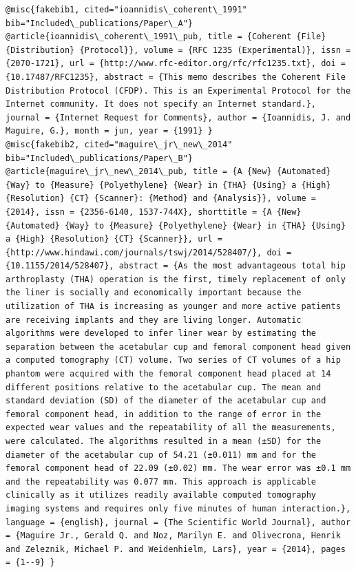 \documentclass[12pt, twoside]{article}
\begin{document}
\begin{lstlisting}[style=latexExampleForAuthors, caption={Examples of fake bibliographic entries}, label=lst:fakebibentry]
@misc{fakebib1, cited="ioannidis\_coherent\_1991" bib="Included\_publications/Paper\_A"}
@article{ioannidis\_coherent\_1991\_pub, title = {Coherent {File} {Distribution} {Protocol}}, volume = {RFC 1235 (Experimental)}, issn = {2070-1721}, url = {http://www.rfc-editor.org/rfc/rfc1235.txt}, doi = {10.17487/RFC1235}, abstract = {This memo describes the Coherent File Distribution Protocol (CFDP). This is an Experimental Protocol for the Internet community. It does not specify an Internet standard.}, journal = {Internet Request for Comments}, author = {Ioannidis, J. and Maguire, G.}, month = jun, year = {1991} }
@misc{fakebib2, cited="maguire\_jr\_new\_2014" bib="Included\_publications/Paper\_B"}
@article{maguire\_jr\_new\_2014\_pub, title = {A {New} {Automated} {Way} to {Measure} {Polyethylene} {Wear} in {THA} {Using} a {High} {Resolution} {CT} {Scanner}: {Method} and {Analysis}}, volume = {2014}, issn = {2356-6140, 1537-744X}, shorttitle = {A {New} {Automated} {Way} to {Measure} {Polyethylene} {Wear} in {THA} {Using} a {High} {Resolution} {CT} {Scanner}}, url = {http://www.hindawi.com/journals/tswj/2014/528407/}, doi = {10.1155/2014/528407}, abstract = {As the most advantageous total hip arthroplasty (THA) operation is the first, timely replacement of only the liner is socially and economically important because the utilization of THA is increasing as younger and more active patients are receiving implants and they are living longer. Automatic algorithms were developed to infer liner wear by estimating the separation between the acetabular cup and femoral component head given a computed tomography (CT) volume. Two series of CT volumes of a hip phantom were acquired with the femoral component head placed at 14 different positions relative to the acetabular cup. The mean and standard deviation (SD) of the diameter of the acetabular cup and femoral component head, in addition to the range of error in the expected wear values and the repeatability of all the measurements, were calculated. The algorithms resulted in a mean (±SD) for the diameter of the acetabular cup of 54.21 (±0.011) mm and for the femoral component head of 22.09 (±0.02) mm. The wear error was ±0.1 mm and the repeatability was 0.077 mm. This approach is applicable clinically as it utilizes readily available computed tomography imaging systems and requires only five minutes of human interaction.}, language = {english}, journal = {The Scientific World Journal}, author = {Maguire Jr., Gerald Q. and Noz, Marilyn E. and Olivecrona, Henrik and Zeleznik, Michael P. and Weidenhielm, Lars}, year = {2014}, pages = {1--9} }
\end{lstlisting}
\end{document}
